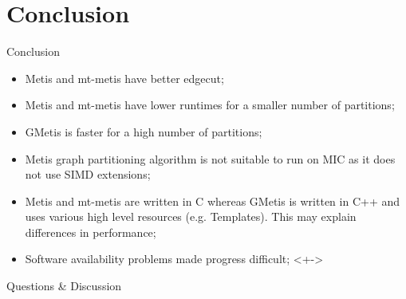 \documentclass{beamer}
\begin{document}



\section{Conclusion}

\begin{frame}{Conclusion}
\begin{itemize}
  \item Metis and mt-metis have better edgecut;
  \item Metis and mt-metis have lower runtimes for a smaller number of partitions;
  \item GMetis is faster for a high number of partitions;
  \item Metis graph partitioning algorithm is not suitable to run on MIC as it does not use SIMD extensions;
  \item Metis and mt-metis are written in C whereas GMetis is written in C++ and uses various high level resources (e.g. Templates). This may explain differences in performance;
  \item Software availability problems made progress difficult; <+->
\end{itemize}
\end{frame}



\begin{frame}
  \titlepage
  \begin{center}
  \huge Questions \& Discussion
  \end{center}
\end{frame}
\end{document}
